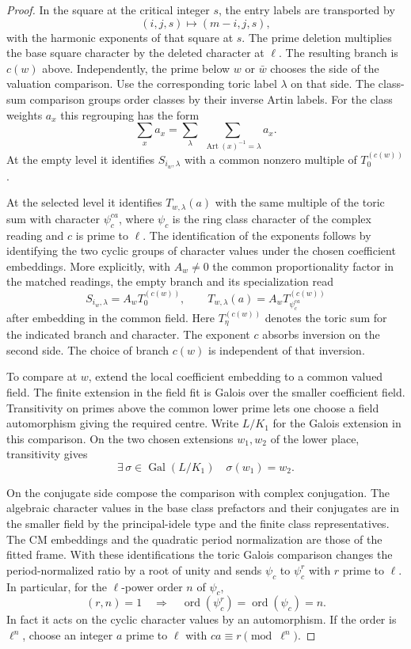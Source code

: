 \begin{proof}

In the square at the critical integer \(s\), the entry labels are transported by
\[
   (i,j,s)\longmapsto (m-i,j,s),
\]
with the harmonic exponents of that square at \(s\).
The prime deletion multiplies the base square character by
the deleted character at \(\ell\). The resulting branch
is \(c(w)\) above. Independently, the prime below \(w\) or
\(\bar w\) chooses the side of the valuation comparison.
Use the corresponding toric label \(\lambda\) on that side.
The class-sum comparison groups order classes by their inverse
Artin labels.
For the class weights \(a_x\) this regrouping has the form
\[
  \sum_x a_x=\sum_\lambda\ \sum_{\operatorname{Art}(x)^{-1}=\lambda}a_x.
\]
 At the empty level it identifies \(S_{i_w,\lambda}\)
with a common nonzero multiple of \(T_0^{(c(w))}\).

At the
selected level it identifies \(T_{w,\lambda}(a)\) with the
same multiple of the toric sum with character \(\psi_c^{ca}\),
where \(\psi_c\) is the ring class character of the complex
reading and \(c\) is prime to \(\ell\). The identification of
the exponents follows by identifying the two cyclic groups of
character values under the chosen coefficient embeddings. More explicitly, with \(A_w\ne0\) the common proportionality
factor in the matched readings, the empty branch and its
specialization read
\[
 S_{i_w,\lambda}=A_w T_0^{(c(w))},\qquad
 T_{w,\lambda}(a)=A_w T_{\psi_c^{ca}}^{(c(w))}
\]
after embedding in the common field. Here \(T_\eta^{(c(w))}\)
denotes the toric sum for the indicated branch and character.
The exponent \(c\) absorbs inversion on the second side.
The choice of branch \(c(w)\) is independent of that inversion.


To compare at \(w\), extend the local coefficient embedding
to a common valued field. The finite extension in the field
fit is Galois over the smaller coefficient field. Transitivity
on primes above the common lower prime lets one choose a
field automorphism giving the required centre.
Write \(L/K_1\) for the Galois extension in this comparison. On the two chosen extensions \(w_1,w_2\) of the lower place, transitivity gives
\[
  \exists\,\sigma\in\operatorname{Gal}(L/K_1)\quad \sigma(w_1)=w_2.
\]

On the conjugate
side compose the comparison with complex conjugation. The
algebraic character values in the base class prefactors and
their conjugates are in the smaller field by the principal-idele
type and the finite class representatives. The CM embeddings
and the quadratic period normalization are those of the fitted
frame. With these identifications the toric Galois comparison changes the
period-normalized ratio by a root of unity and sends
\(\psi_c\) to \(\psi_c^r\) with \(r\) prime to \(\ell\).
In particular, for the \(\ell\)-power order \(n\) of \(\psi_c\),
\[
  (r,n)=1\quad\Longrightarrow\quad\operatorname{ord}(\psi_c^r)=\operatorname{ord}(\psi_c)=n .
\]
In fact it acts on the cyclic character values by an automorphism.
If the order is \(\ell^n\), choose an integer \(a\) prime to
\(\ell\) with \(ca\equiv r\pmod{\ell^n}\).


\end{proof}
